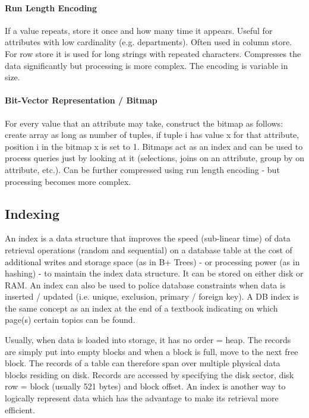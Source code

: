 \paragraph{Run Length Encoding}
If a value repeats, store it once and how many time it appears. Useful for attributes with low cardinality (e.g. departments). Often used in column store. For row store it is used for long strings with repeated characters. Compresses the data significantly but processing is more complex. The encoding is variable in size.

\paragraph{Bit-Vector Representation / Bitmap}
For every value that an attribute may take, construct the bitmap as follows: create array as long as number of tuples, if tuple i has value x for that attribute, position i in the bitmap x is set to 1. Bitmaps act as an index and can be used to process queries just by looking at it (selections, joins on an attribute, group by on attribute, etc.). Can be further compressed using run length encoding - but processing becomes more complex.





\subsection{Indexing}

An index is a data structure that improves the speed (sub-linear time) of data retrieval operations (random and sequential) on a database table at the cost of additional writes and storage space (as in B+ Trees) - or processing power (as in hashing) - to maintain the index data structure. It can be stored on either disk or RAM. An index can also be used to police database constraints when data is inserted / updated (i.e. unique, exclusion, primary / foreign key). A DB index is the same concept as an index at the end of a textbook indicating on which page(s) certain topics can be found.

Usually, when data is loaded into storage, it has no order = heap. The records are simply put into empty blocks and when a block is full, move to the next free block. The records of a table can therefore span over multiple physical data blocks residing on disk. Records are accessed by specifying the disk sector, disk row = block (usually 521 bytes) and block offset. An index is another way to logically represent data which has the advantage to make its retrieval more efficient.


